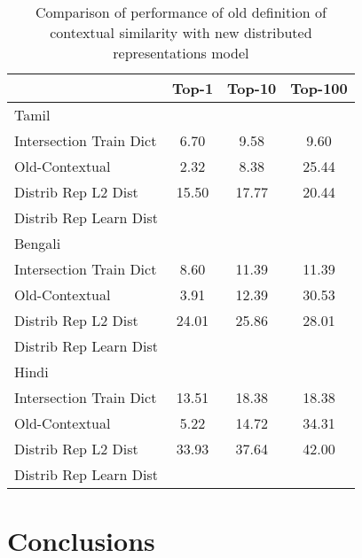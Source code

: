 \documentclass[11pt,letterpaper]{article}
\begin{document}
\begin{table}
\begin{center}
\begin{tabular}{|l|c|c|c|}
\hline
& Top-1 & Top-10 & Top-100 \\
\hline
\multicolumn{4}{|l|}{Tamil}  \\
\hline
Intersection Train Dict & 6.70 & 9.58 & 9.60 \\
Old-Contextual & 2.32 & 8.38 & 25.44 \\ 
Distrib Rep L2 Dist & 15.50 & 17.77 & 20.44 \\
Distrib Rep Learn Dist & & & \\
\hline
\multicolumn{4}{|l|}{Bengali}  \\
\hline
Intersection Train Dict & 8.60 & 11.39 & 11.39 \\
Old-Contextual & 3.91 & 12.39 & 30.53 \\
Distrib Rep L2 Dist & 24.01 & 25.86 & 28.01 \\
Distrib Rep Learn Dist & & & \\
\hline
\multicolumn{4}{|l|}{Hindi}  \\
\hline
Intersection Train Dict & 13.51 & 18.38 & 18.38 \\
Old-Contextual & 5.22 & 14.72 & 34.31 \\
Distrib Rep L2 Dist & 33.93 & 37.64 & 42.00 \\
Distrib Rep Learn Dist & & & \\
\hline
\end{tabular}
\end{center}
\caption{Comparison of performance of old definition of contextual similarity with new distributed representations model}\label{accresults}
\end{table}



\section{Conclusions} \label{sect:conclusions}



\end{document}
